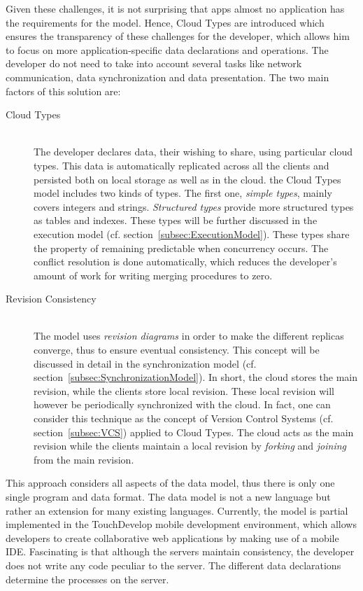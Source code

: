 \documentclass[a4paper,12pt]{report}
\begin{document}
Given these challenges, it is not surprising that apps almost no application has the requirements for the model. Hence, Cloud Types are introduced which ensures the transparency of these challenges for the developer, which allows him to focus on more application-specific data declarations and operations. The developer do not need to take into account several tasks like network communication, data synchronization and data presentation. The two main factors of this solution are:

\begin{description}
    \item[Cloud Types] \hfill \\The developer declares data, their wishing to share, using particular cloud types. This data is automatically replicated across all the clients and persisted both on local storage as well as in the cloud. the Cloud Types model includes two kinds of types. The first one, \textit{simple types}, mainly covers integers and strings. \textit{Structured types} provide more structured types as tables and indexes. These types will be further discussed in the execution model (cf. section~\ref{subsec:ExecutionModel}). These types share the property of remaining predictable when concurrency occurs. The conflict resolution is done automatically, which reduces the developer's amount of work for writing merging procedures to zero.
    \item[Revision Consistency] \hfill \\ The model uses \textit{revision diagrams} in order to make the different replicas converge, thus to ensure eventual consistency. This concept will be discussed in detail in the synchronization model (cf. section~\ref{subsec:SynchronizationModel}). In short, the cloud stores the main revision, while the clients store local revision. These local revision will however be periodically synchronized with the cloud. In fact, one can consider this technique as the concept of Version Control Systems (cf. section~\ref{subsec:VCS}) applied to Cloud Types. The cloud acts as the main revision while the clients maintain a local revision by \textit{forking} and \textit{joining} from the main revision.
\end{description} 

This approach considers all aspects of the data model, thus there is only one single program and data format. The data model is not a new language but rather an extension for many existing languages. Currently, the model is partial implemented in the TouchDevelop mobile development environment, which allows developers to create collaborative web applications by making use of a mobile IDE. Fascinating is that although the servers maintain consistency, the developer does not write any code peculiar to the server. The different data declarations determine the processes on the server. 
\end{document}
